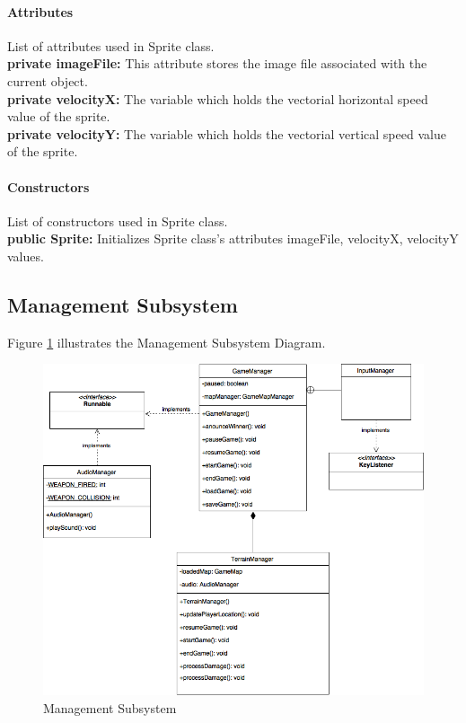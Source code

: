 \documentclass[12pt]{article} %
\begin{document}
\paragraph{Attributes\\}

List of attributes used in Sprite class.\\
\textbf{private imageFile:} This attribute stores the image file associated with the current object.\\
\textbf{private velocityX:} The variable which holds the vectorial horizontal speed value of the sprite.\\
\textbf{private velocityY:} The variable which holds the vectorial vertical speed value of the sprite.\\
\paragraph{Constructors \\}
List of constructors used in Sprite class.\\
\textbf{public Sprite:} Initializes Sprite class's attributes imageFile, velocityX, velocityY values.




\subsection{Management Subsystem}

Figure \ref{fig:controller} illustrates the Management Subsystem Diagram.

\begin{figure}[h!]
   \centering
   \vspace{10pt}%
   \includegraphics[width=17cm]{controller.png}
   \caption{Management Subsystem}
   \label{fig:controller}
\end{figure}
\end{document}
